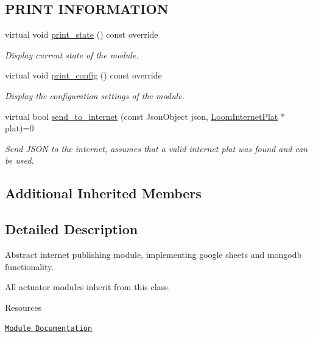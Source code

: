 \subsection*{P\+R\+I\+NT I\+N\+F\+O\+R\+M\+A\+T\+I\+ON}
\begin{DoxyCompactItemize}
\item 
virtual void \hyperlink{class_loom_publish_plat_a0055306a6b0efc49d83f083c1398eea1}{print\+\_\+state} () const override
\begin{DoxyCompactList}\small\item\em Display current state of the module. \end{DoxyCompactList}\item 
virtual void \hyperlink{class_loom_publish_plat_a38cc9fe71203a153392fbca807e39434}{print\+\_\+config} () const override
\begin{DoxyCompactList}\small\item\em Display the configuration settings of the module. \end{DoxyCompactList}\item 
virtual bool \hyperlink{class_loom_publish_plat_a5d54196f11ef28daf8fdf853f215a033}{send\+\_\+to\+\_\+internet} (const Json\+Object json, \hyperlink{class_loom_internet_plat}{Loom\+Internet\+Plat} $\ast$plat)=0
\begin{DoxyCompactList}\small\item\em Send J\+S\+ON to the internet, assumes that a valid internet plat was found and can be used. \end{DoxyCompactList}\end{DoxyCompactItemize}
\subsection*{Additional Inherited Members}


\subsection{Detailed Description}
Abstract internet publishing module, implementing google sheets and mongodb functionality. 

All actuator modules inherit from this class.

\begin{DoxyParagraph}{Resources}

\begin{DoxyItemize}
\item \href{https://openslab-osu.github.io/Loom/html/class_loom_publish_plat.html}{\tt Module Documentation} 
\end{DoxyItemize}
\end{DoxyParagraph}


